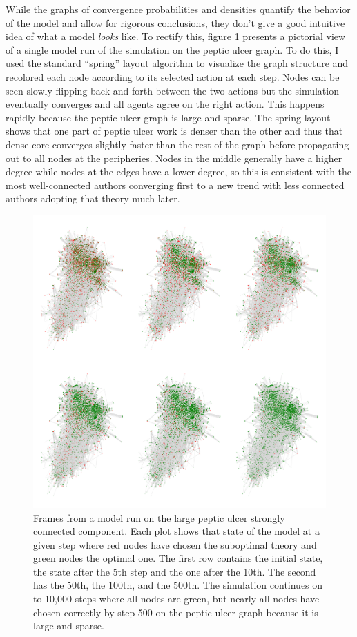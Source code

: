 While the graphs of convergence probabilities and densities quantify the
behavior of the model and allow for rigorous conclusions, they don't
give a good intuitive idea of what a model \emph{looks} like. To rectify
this, figure \ref{fig:pepticprog} presents a pictorial view of a single
model run of the simulation on the peptic ulcer graph. To do this, I
used the standard ``spring'' layout algorithm to visualize the graph
structure and recolored each node according to its selected action at
each step. Nodes can be seen slowly flipping back and forth between the
two actions but the simulation eventually converges and all agents agree
on the right action. This happens rapidly because the peptic ulcer graph
is large and sparse. The spring layout shows that one part of peptic
ulcer work is denser than the other and thus that dense core converges
slightly faster than the rest of the graph before propagating out to all
nodes at the peripheries. Nodes in the middle generally have a higher
degree while nodes at the edges have a lower degree, so this is
consistent with the most well-connected authors converging first to a
new trend with less connected authors adopting that theory much later.

\begin{figure}
\hypertarget{fig:pepticprog}{%
\centering
\includegraphics{figures/peptic_ulcer_1-5-10-50-100-500.png}
\caption{Frames from a model run on the large peptic ulcer strongly
connected component. Each plot shows that state of the model at a given
step where red nodes have chosen the suboptimal theory and green nodes
the optimal one. The first row contains the initial state, the state
after the 5th step and the one after the 10th. The second has the 50th,
the 100th, and the 500th. The simulation continues on to 10,000 steps
where all nodes are green, but nearly all nodes have chosen correctly by
step 500 on the peptic ulcer graph because it is large and
sparse.}\label{fig:pepticprog}
}
\end{figure}

